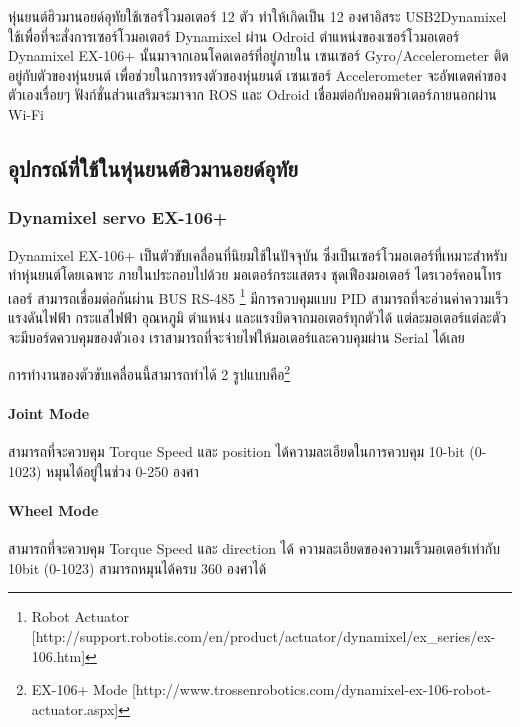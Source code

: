 
หุ่นยนต์ฮิวมานอยด์อุทัยใช้เซอร์โวมอเตอร์ 12 ตัว ทำให้เกิดเป็น 12 องศาอิสระ
USB2Dynamixel ใช้เพื่อที่จะสั่งการเซอร์โวมอเตอร์ Dynamixel ผ่าน Odroid
ตำแหน่งของเซอร์โวมอเตอร์ Dynamixel EX-106+ นั้นมาจากเอนโคดเดอร์ที่อยู่ภายใน
เซนเซอร์ Gyro/Accelerometer ติดอยู่กับตัวของหุ่นยนต์ เพื่อช่วยในการทรงตัวของหุ่นยนต์
เซนเซอร์ Accelerometer จะอัพเดตค่าของตัวเองเรื่อยๆ ฟังก์ชั่นส่วนเสริมจะมาจาก ROS
และ Odroid เชื่อมต่อกับคอมพิวเตอร์ภายนอกผ่าน Wi-Fi

\clearpage
\subsection{อุปกรณ์ที่ใช้ในหุ่นยนต์ฮิวมานอยด์อุทัย}

\subsubsection*{Dynamixel servo EX-106+}
Dynamixel EX-106+ เป็นตัวขับเคลื่อนที่นิยมใช้ในปัจจุบัน ซึ่งเป็นเซอร์โวมอเตอร์ที่เหมาะสำหรับทำหุ่นยนต์โดยเฉพาะ
ภายในประกอบไปด้วย มอเตอร์กระแสตรง ชุดเฟืองมอเตอร์ ไดรเวอร์คอนโทรเลอร์ สามารถเชื่อมต่อกันผ่าน BUS RS-485
\footnote{ Robot Actuator [http://support.robotis.com/en/product/actuator/dynamixel/ex\_series/ex-106.htm] }
มีการควบคุมแบบ PID สามารถที่จะอ่านค่าความเร็ว
แรงดันไฟฟ้า กระแสไฟฟ้า อุณหภูมิ ตำแหน่ง และแรงบิดจากมอเตอร์ทุกตัวได้ แต่ละมอเตอร์แต่ละตัวจะมีบอร์ดควบคุมของตัวเอง
เราสามารถที่จะจ่ายไฟให้มอเตอร์และควบคุมผ่าน Serial ได้เลย

การทำงานของตัวขับเคลื่อนนี้สามารถทำได้ 2 รูปแบบคือ\footnote{ EX-106+ Mode [http://www.trossenrobotics.com/dynamixel-ex-106-robot-actuator.aspx] }

\paragraph*{Joint Mode}
สามารถที่จะควบคุม Torque Speed และ position ได้ความละเอียดในการควบคุม 10-bit (0-1023) หมุนได้อยู่ในช่วง 0-250 องศา

\paragraph*{Wheel Mode}
สามารถที่จะควบคุม Torque Speed และ direction ได้ ความละเอียดของความเร็วมอเตอร์เท่ากับ 10bit (0-1023) สามารถหมุนได้ครบ 360 องศาได้


